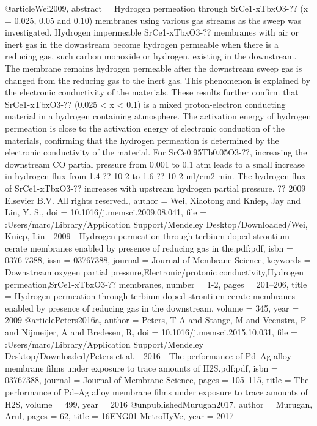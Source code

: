 @article{Wei2009,
abstract = {Hydrogen permeation through SrCe1-xTbxO3-?? (x = 0.025, 0.05 and 0.10) membranes using various gas streams as the sweep was investigated. Hydrogen impermeable SrCe1-xTbxO3-?? membranes with air or inert gas in the downstream become hydrogen permeable when there is a reducing gas, such carbon monoxide or hydrogen, existing in the downstream. The membrane remains hydrogen permeable after the downstream sweep gas is changed from the reducing gas to the inert gas. This phenomenon is explained by the electronic conductivity of the materials. These results further confirm that SrCe1-xTbxO3-?? (0.025 {\textless} x {\textless} 0.1) is a mixed proton-electron conducting material in a hydrogen containing atmosphere. The activation energy of hydrogen permeation is close to the activation energy of electronic conduction of the materials, confirming that the hydrogen permeation is determined by the electronic conductivity of the material. For SrCe0.95Tb0.05O3-??, increasing the downstream CO partial pressure from 0.001 to 0.1 atm leads to a small increase in hydrogen flux from 1.4 ?? 10-2 to 1.6 ?? 10-2 ml/cm2 min. The hydrogen flux of SrCe1-xTbxO3-?? increases with upstream hydrogen partial pressure. ?? 2009 Elsevier B.V. All rights reserved.},
author = {Wei, Xiaotong and Kniep, Jay and Lin, Y. S.},
doi = {10.1016/j.memsci.2009.08.041},
file = {:Users/marc/Library/Application Support/Mendeley Desktop/Downloaded/Wei, Kniep, Lin - 2009 - Hydrogen permeation through terbium doped strontium cerate membranes enabled by presence of reducing gas in the.pdf:pdf},
isbn = {0376-7388},
issn = {03767388},
journal = {Journal of Membrane Science},
keywords = {Downstream oxygen partial pressure,Electronic/protonic conductivity,Hydrogen permeation,SrCe1-xTbxO3-?? membranes},
number = {1-2},
pages = {201--206},
title = {{Hydrogen permeation through terbium doped strontium cerate membranes enabled by presence of reducing gas in the downstream}},
volume = {345},
year = {2009}
}
@article{Peters2016a,
author = {Peters, T A and Stange, M and Veenstra, P and Nijmeijer, A and Bredesen, R},
doi = {10.1016/j.memsci.2015.10.031},
file = {:Users/marc/Library/Application Support/Mendeley Desktop/Downloaded/Peters et al. - 2016 - The performance of Pd–Ag alloy membrane films under exposure to trace amounts of H2S.pdf:pdf},
isbn = {03767388},
journal = {Journal of Membrane Science},
pages = {105--115},
title = {{The performance of Pd–Ag alloy membrane films under exposure to trace amounts of H2S}},
volume = {499},
year = {2016}
}
@unpublished{Murugan2017,
author = {Murugan, Arul},
pages = {62},
title = {{16ENG01 MetroHyVe}},
year = {2017}
}
